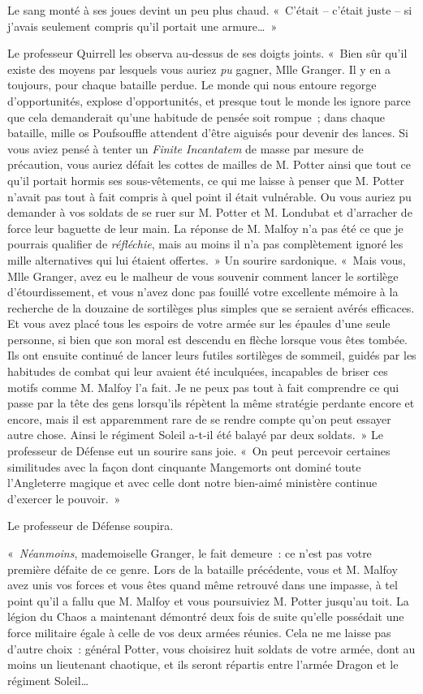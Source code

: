 Le sang monté à ses joues devint un peu plus chaud. «~C'était -- c'était juste -- si j'avais seulement compris qu'il portait une armure…~»

Le professeur Quirrell les observa au-dessus de ses doigts joints. «~Bien sûr qu'il existe des moyens par lesquels vous auriez \emph{pu} gagner, Mlle Granger. Il y en a toujours, pour chaque bataille perdue. Le monde qui nous entoure regorge d'opportunités, explose d'opportunités, et presque tout le monde les ignore parce que cela demanderait qu'une habitude de pensée soit rompue~; dans chaque bataille, mille os Poufsouffle attendent d'être aiguisés pour devenir des lances. Si vous aviez pensé à tenter un \emph{Finite Incantatem} de masse par mesure de précaution, vous auriez défait les cottes de mailles de M. Potter ainsi que tout ce qu'il portait hormis ses sous-vêtements, ce qui me laisse à penser que M. Potter n'avait pas tout à fait compris à quel point il était vulnérable. Ou vous auriez pu demander à vos soldats de se ruer sur M. Potter et M. Londubat et d'arracher de force leur baguette de leur main. La réponse de M. Malfoy n'a pas été ce que je pourrais qualifier de \emph{réfléchie}, mais au moins il n'a pas complètement ignoré les mille alternatives qui lui étaient offertes.~» Un sourire sardonique. «~Mais vous, Mlle Granger, avez eu le malheur de vous souvenir comment lancer le sortilège d'étourdissement, et vous n'avez donc pas fouillé votre excellente mémoire à la recherche de la douzaine de sortilèges plus simples que se seraient avérés efficaces. Et vous avez placé tous les espoirs de votre armée sur les épaules d'une seule personne, si bien que son moral est descendu en flèche lorsque vous êtes tombée. Ils ont ensuite continué de lancer leurs futiles sortilèges de sommeil, guidés par les habitudes de combat qui leur avaient été inculquées, incapables de briser ces motifs comme M. Malfoy l'a fait. Je ne peux pas tout à fait comprendre ce qui passe par la tête des gens lorsqu'ils répètent la même stratégie perdante encore et encore, mais il est apparemment rare de se rendre compte qu'on peut essayer autre chose. Ainsi le régiment Soleil a-t-il été balayé par deux soldats.~» Le professeur de Défense eut un sourire sans joie. «~On peut percevoir certaines similitudes avec la façon dont cinquante Mangemorts ont dominé toute l'Angleterre magique et avec celle dont notre bien-aimé ministère continue d'exercer le pouvoir.~»

Le professeur de Défense soupira.

«~\emph{Néanmoins}, mademoiselle Granger, le fait demeure~: ce n'est pas votre première défaite de ce genre. Lors de la bataille précédente, vous et M. Malfoy avez unis vos forces et vous êtes quand même retrouvé dans une impasse, à tel point qu'il a fallu que M. Malfoy et vous poursuiviez M. Potter jusqu'au toit. La légion du Chaos a maintenant démontré deux fois de suite qu'elle possédait une force militaire égale à celle de vos deux armées réunies. Cela ne me laisse pas d'autre choix~: général Potter, vous choisirez huit soldats de votre armée, dont au moins un lieutenant chaotique, et ils seront répartis entre l'armée Dragon et le régiment Soleil…

